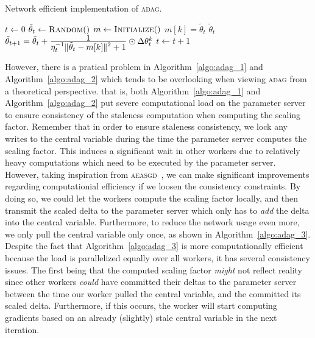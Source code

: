 \begin{algorithm}[H]
  \caption{Network efficient implementation of \textsc{adag}.}
  \label{algo:adag_2}
  \begin{algorithmic}[1]
    \State $t \gets 0$ 
    \State $\tilde{\theta}_t \gets \Call{Random}$
    \State $m \gets \Call{Initialize}$ 
    \State
     
    \State $m[k] = \tilde{\theta}_t$
    \State \Return $\tilde{\theta}_{t}$
    \EndProcedure
    \State
    \State $\tilde{\theta}_{t + 1} = \tilde{\theta}_t + \frac{\displaystyle 1}{\displaystyle \eta_t^{-1}\|\tilde{\theta}_t - m[k]\|^2 + 1} \odot \Delta\theta^k_t$
    \State $t \gets t + 1$
    \EndProcedure
    \State
    \EndProcedure
  \end{algorithmic}
\end{algorithm}

However, there is a pratical problem in Algorithm~\ref{algo:adag_1} and Algorithm~\ref{algo:adag_2} which tends to be overlooking when viewing \textsc{adag} from a theoretical perspective. that is, both Algorithm~\ref{algo:adag_1} and Algorithm~\ref{algo:adag_2} put severe computational load on the parameter server to ensure consistency of the staleness computation when computing the scaling factor. Remember that in order to ensure staleness consistency, we lock any writes to the central variable during the time the parameter server computes the scaling factor. This induces a significant wait in other workers due to relatively heavy computations which need to be executed by the parameter server. However, taking inspiration from \textsc{aeasgd}~\cite{zhang2015deep}, we can make significant improvements regarding computationial efficiency if we loosen the consistency constraints. By doing so, we could let the workers compute the scaling factor locally, and then transmit the scaled delta to the parameter server which only has to \emph{add} the delta into the central variable. Furthermore, to reduce the network usage even more, we only pull the central variable only once, as shown in Algorithm~\ref{algo:adag_3}. Despite the fact that Algorithm~\ref{algo:adag_3} is more computationally efficient because the load is parallelized equally over all workers, it has several consistency issues. The first being that the computed scaling factor \emph{might} not reflect reality since other workers \emph{could} have committed their deltas to the parameter server between the time our worker pulled the central variable, and the committed its scaled delta. Furthermore, if this occurs, the worker will start computing gradients based on an already (slightly) stale central variable in the next iteration.


